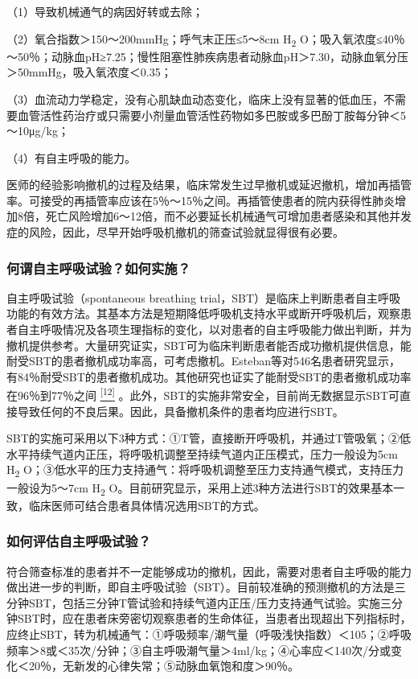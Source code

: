 （1）导致机械通气的病因好转或去除；

（2）氧合指数＞150～200mmHg；呼气末正压≤5～8cm H\textsubscript{2}
O；吸入氧浓度≤40％～50％；动脉血pH≥7.25；慢性阻塞性肺疾病患者动脉血pH＞7.30，动脉血氧分压＞50mmHg，吸入氧浓度＜0.35；

（3）血流动力学稳定，没有心肌缺血动态变化，临床上没有显著的低血压，不需要血管活性药治疗或只需要小剂量血管活性药物如多巴胺或多巴酚丁胺每分钟＜5～10μg/kg；

（4）有自主呼吸的能力。

医师的经验影响撤机的过程及结果，临床常发生过早撤机或延迟撤机，增加再插管率。可接受的再插管率应该在5％～15％之间。再插管使患者的院内获得性肺炎增加8倍，死亡风险增加6～12倍，而不必要延长机械通气可增加患者感染和其他并发症的风险，因此，尽早开始呼吸机撤机的筛查试验就显得很有必要。

\subsubsection{何谓自主呼吸试验？如何实施？}

自主呼吸试验（spontaneous breathing
trial，SBT）是临床上判断患者自主呼吸功能的有效方法。其基本方法是短期降低呼吸机支持水平或断开呼吸机后，观察患者自主呼吸情况及各项生理指标的变化，以对患者的自主呼吸能力做出判断，并为撤机提供参考。大量研究证实，SBT可为临床判断患者能否成功撤机提供信息，能耐受SBT的患者撤机成功率高，可考虑撤机。Esteban等对546名患者研究显示，有84％耐受SBT的患者撤机成功。其他研究也证实了能耐受SBT的患者撤机成功率在96％到77％之间
\protect\hyperlink{text00016.htmlux5cux23ch12-15}{\textsuperscript{{[}12{]}}}
。此外，SBT的实施非常安全，目前尚无数据显示SBT可直接导致任何的不良后果。因此，具备撤机条件的患者均应进行SBT。

SBT的实施可采用以下3种方式：①T管，直接断开呼吸机，并通过T管吸氧；②低水平持续气道内正压，将呼吸机调整至持续气道内正压模式，压力一般设为5cm
H\textsubscript{2}
O；③低水平的压力支持通气：将呼吸机调整至压力支持通气模式，支持压力一般设为5～7cm
H\textsubscript{2}
O。目前研究显示，采用上述3种方法进行SBT的效果基本一致，临床医师可结合患者具体情况选用SBT的方式。

\subsubsection{如何评估自主呼吸试验？}

符合筛查标准的患者并不一定能够成功的撤机，因此，需要对患者自主呼吸的能力做出进一步的判断，即自主呼吸试验（SBT）。目前较准确的预测撤机的方法是三分钟SBT，包括三分钟T管试验和持续气道内正压/压力支持通气试验。实施三分钟SBT时，应在患者床旁密切观察患者的生命体征，当患者出现超出下列指标时，应终止SBT，转为机械通气：①呼吸频率/潮气量（呼吸浅快指数）＜105；②呼吸频率＞8或＜35次/分钟；③自主呼吸潮气量＞4ml/kg；④心率应＜140次/分或变化＜20％，无新发的心律失常；⑤动脉血氧饱和度＞90％。

